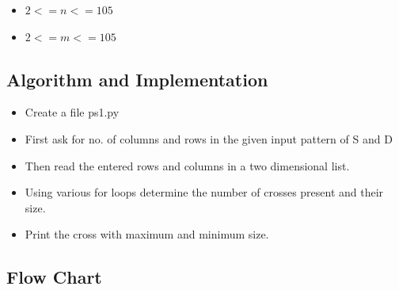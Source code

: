\documentclass[12pt]{article}
\begin{document}
			\begin{itemize}
				\item $2<=n<=105$
				\item $2<=m<=105$
			\end{itemize}
		
		\subsection{Algorithm and Implementation~\cite{problem2}~\cite{problem1}}
		
			\begin{itemize}
				\item Create a file ps1.py
				\item First ask for no. of columns and rows in the given input pattern of S and D
			    \item Then read the entered rows and columns in a two dimensional list.
			    \item Using various for loops determine the number of crosses present and their size.
			    \item Print the cross with maximum and minimum size.
			\end{itemize}

		\subsection{Flow Chart}
		
\end{document}
